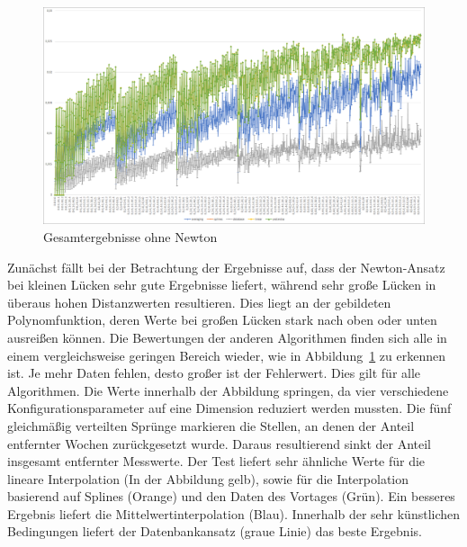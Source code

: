 \begin{figure}[!t]
	\begin{center}
		\includegraphics[width=0.9\columnwidth]{pics/evaluation-algorithms}
	\end{center}
	\caption{\label{fig:evaluation_algorithms}Gesamtergebnisse ohne Newton}
\end{figure}

Zunächst fällt bei der Betrachtung der Ergebnisse auf, dass der Newton-Ansatz bei kleinen Lücken sehr gute Ergebnisse liefert, während sehr große Lücken in überaus hohen Distanzwerten resultieren. Dies liegt an der gebildeten Polynomfunktion, deren Werte bei großen Lücken stark nach oben oder unten ausreißen können.
Die Bewertungen der anderen Algorithmen finden sich alle in einem vergleichsweise geringen Bereich wieder, wie in Abbildung~\ref{fig:evaluation_algorithms} zu erkennen ist. Je mehr Daten fehlen, desto großer ist der Fehlerwert. Dies gilt für alle Algorithmen. Die Werte innerhalb der Abbildung springen, da vier verschiedene Konfigurationsparameter auf eine Dimension reduziert werden mussten. Die fünf gleichmäßig verteilten Sprünge markieren die Stellen, an denen der Anteil entfernter Wochen zurückgesetzt wurde. Daraus resultierend sinkt der Anteil insgesamt entfernter Messwerte.
Der Test liefert sehr ähnliche Werte für die lineare Interpolation (In der Abbildung gelb), sowie für die Interpolation basierend auf Splines (Orange) und den Daten des Vortages (Grün). Ein besseres Ergebnis liefert die Mittelwertinterpolation (Blau). Innerhalb der sehr künstlichen Bedingungen liefert der Datenbankansatz (graue Linie) das beste Ergebnis.

